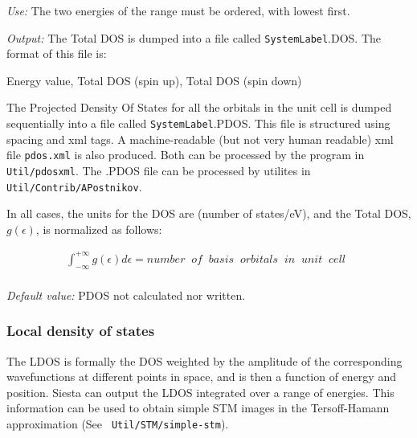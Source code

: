 \documentclass[11pt]{article}
\begin{document}
\begin{description}
{\it Use:} The two energies of the range must be ordered, with lowest
first. 

{\it Output:} The Total DOS is dumped into a file
called {\tt SystemLabel}.DOS. The format of this file is:

Energy value, Total DOS (spin up), Total DOS (spin down)

The Projected Density Of States for all the orbitals in the unit cell
is dumped sequentially into a file called {\tt SystemLabel}.PDOS. This
file is structured using spacing and xml tags. A machine-readable (but
not very human readable) xml file {\tt pdos.xml} is also
produced. Both can be processed by the program in {\tt
  Util/pdosxml}. The .PDOS file can be processed by utilites in {\tt
  Util/Contrib/APostnikov}.

In all cases, the units for the DOS are (number of states/eV), and the
Total DOS, $g \left(\epsilon\right)$, is normalized as follows:

\begin{eqnarray}
   \int_{-\infty}^{+\infty} g \left(\epsilon\right) d\epsilon = 
   number \;\; of \;\; basis \;\; orbitals \;\; in \;\;  unit \;\; cell \;\;
   \nonumber \\
\end{eqnarray}


{\it Default value:} PDOS not calculated nor written.
\end{description}


\subsubsection{Local density of states}

The LDOS is formally the DOS weighted by the amplitude of the
corresponding wavefunctions at different points in space, and is then
a function of energy and position. {\sc Siesta} can output the LDOS
integrated over a range of energies.  This information can be used to
obtain simple STM images in the Tersoff-Hamann approximation (See {\tt
  Util/STM/simple-stm}).
\end{document}
